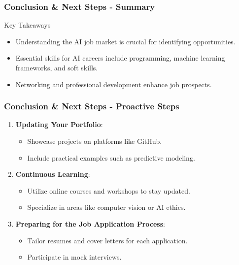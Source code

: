 \documentclass{beamer}
\begin{document}
\begin{frame}[fragile]
    \frametitle{Conclusion \& Next Steps - Summary}
    \begin{block}{Key Takeaways}
        \begin{itemize}
            \item Understanding the AI job market is crucial for identifying opportunities.
            \item Essential skills for AI careers include programming, machine learning frameworks, and soft skills.
            \item Networking and professional development enhance job prospects.
        \end{itemize}
    \end{block}
\end{frame}

\begin{frame}[fragile]
    \frametitle{Conclusion \& Next Steps - Proactive Steps}
    \begin{enumerate}
        \item \textbf{Updating Your Portfolio}:
            \begin{itemize}
                \item Showcase projects on platforms like GitHub.
                \item Include practical examples such as predictive modeling.
            \end{itemize}
        
        \item \textbf{Continuous Learning}:
            \begin{itemize}
                \item Utilize online courses and workshops to stay updated.
                \item Specialize in areas like computer vision or AI ethics.
            \end{itemize}
        
        \item \textbf{Preparing for the Job Application Process}:
            \begin{itemize}
                \item Tailor resumes and cover letters for each application.
                \item Participate in mock interviews.
            \end{itemize}
    \end{enumerate}
\end{frame}
\end{document}
